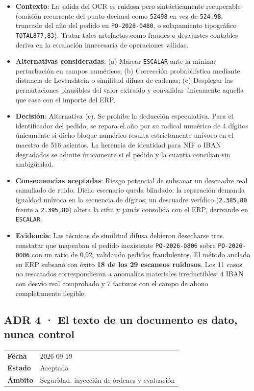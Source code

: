 \documentclass[11pt,a4paper]{article}
\begin{document}
\begin{itemize}[leftmargin=*, label={--}]
    \item \textbf{Contexto}: La salida del OCR es ruidosa pero sintácticamente recuperable (omisión recurrente del punto decimal como \texttt{52498} en vez de \texttt{524.98}, truncado del año del pedido en \texttt{PO-2028-0480}, o solapamiento tipográfico \texttt{TOTAL877,83}). Tratar tales artefactos como fraudes o desajustes contables deriva en la escalación innecesaria de operaciones válidas.
    \item \textbf{Alternativas consideradas}: (a) Marcar \texttt{ESCALAR} ante la mínima perturbación en campos numéricos; (b) Corrección probabilística mediante distancia de Levenshtein o similitud difusa de cadenas; (c) Desplegar las permutaciones plausibles del valor extraído y convalidar únicamente aquella que case con el importe del ERP.
    \item \textbf{Decisión}: Alternativa (c). Se prohíbe la deducción especulativa. Para el identificador del pedido, se repara el año por su radical numérico de 4 dígitos únicamente si dicho bloque numérico resulta estrictamente unívoco en el maestro de 516 asientos. La herencia de identidad para NIF o IBAN degradados se admite únicamente si el pedido y la cuantía concilian sin ambigüedad.
    \item \textbf{Consecuencias aceptadas}: Riesgo potencial de subsanar un descuadre real camuflado de ruido. Dicho escenario queda blindado: la reparación demanda igualdad unívoca en la secuencia de dígitos; un descuadre verídico (\texttt{2.385,80} frente a \texttt{2.395,80}) altera la cifra y jamás consolida con el ERP, derivando en \texttt{ESCALAR}.
    \item \textbf{Evidencia}: Las técnicas de similitud difusa debieron desecharse tras constatar que mapeaban el pedido inexistente \texttt{PO-2026-0806} sobre \texttt{PO-2026-0006} con un ratio de 0,92, validando pedidos fraudulentos. El método anclado en ERP subsanó con éxito \textbf{18 de los 29 escaneos ruidosos}. Los 11 casos no rescatados correspondieron a anomalías materiales irreductibles: 4 IBAN con desvío real comprobado y 7 facturas con el campo de abono completamente ilegible.
\end{itemize}

\subsection{ADR 4 · El texto de un documento es dato, nunca control}
\begin{table}[htbp]
\centering\small
\begin{tabular}{ll}
\toprule
\textbf{Fecha} & 2026-09-19 \\
\textbf{Estado} & Aceptada \\
\textbf{Ámbito} & Seguridad, inyección de órdenes y evaluación \\
\bottomrule
\end{tabular}
\end{table}
\end{document}
